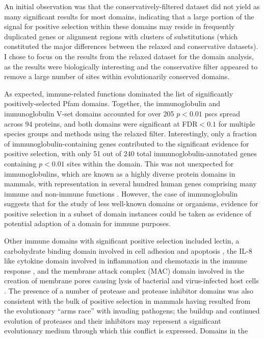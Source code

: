 An initial observation was that the conservatively-filtered dataset
did not yield as many significant results for most domains, indicating
that a large portion of the signal for positive selection within these
domains may reside in frequently duplicated genes or alignment regions
with clusters of \nsyn substitutions (which constituted the major
differences between the relaxed and conservative \sw datasets). I
chose to focus on the results from the relaxed dataset for the domain
analysis, as the results were biologically interesting and the
conservative filter appeared to remove a large number of sites within
evolutionarily conserved domains.

As expected, immune-related functions dominated the list of
significantly positively-selected Pfam domains. Together, the
immunoglobulin and immunoglobulin V-set domains accounted for over 205
$p<0.01$ \acp{psc} spread across 94 proteins, and both domains were
significant at FDR$<0.1$ for multiple species groups and methods using
the relaxed \sw filter. Interestingly, only a fraction of
immunoglobulin-containing genes contributed to the significant
evidence for positive selection, with only 51 out of 240 total
immunoglobulin-annotated genes containing $p<0.01$ sites within the
domain. This was not unexpected for immunoglobulins, which are known
as a highly diverse protein domains in mammals, with representation in
several hundred human genes comprising many immune and non-immune
functions \citep{Lander2001}. However, the case of immunoglobulin
suggests that for the study of less well-known domains or organisms,
evidence for positive selection in a subset of domain instances could
be taken as evidence of potential adaption of a domain for immune
purposes.

Other immune domains with significant positive selection included
lectin, a carbohydrate binding domain involved in cell adhesion and
apoptosis \citep{Cambi2009}, the IL-8 like cytokine domain involved in
inflammation and chemotaxis in the immune response \citep{Stein2005},
and the membrane attack complex (MAC) domain involved in the creation
of membrane pores causing lysis of bacterial and virus-infected host
cells \citep{Lovelace2011}. The presence of a number of protease and
protease inhibitor domains was also consistent with the bulk of
positive selection in mammals having resulted from the evolutionary
``arms race'' with invading pathogens; the buildup and continued
evolution of proteases and their inhibitors may represent a
significant evolutionary medium through which this conflict is
expressed. Domains in the 

